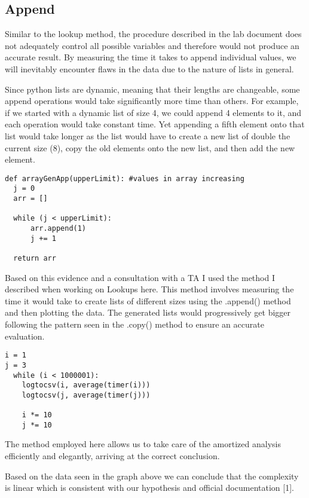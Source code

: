 \documentclass[12pt]{article}
\begin{document}
\subsection{Append}

Similar to the lookup method, the procedure described in the lab document does not adequately control all possible variables and therefore would not produce an accurate result. By measuring the time it takes to append individual values, we will inevitably encounter flaws in the data due to the nature of lists in general. 

Since python lists are dynamic, meaning that their lengths are changeable, some append operations would take significantly more time than others. For example, if we started with a dynamic list of size 4, we could append 4 elements to it, and each operation would take constant time. Yet appending a fifth element onto that list would take longer as the list would have to create a new list of double the current size (8), copy the old elements onto the new list, and then add the new element. 

\footnotesize
\begin{verbatim}
def arrayGenApp(upperLimit): #values in array increasing
  j = 0
  arr = []
  
  while (j < upperLimit):
      arr.append(1)
      j += 1

  return arr
\end{verbatim}
\normalsize

Based on this evidence and a consultation with a TA I used the method I described when working on Lookups here. This method involves measuring the time it would take to create lists of different sizes using the .append() method and then plotting the data. The generated lists would progressively get bigger following the pattern seen in the .copy() method to ensure an accurate evaluation.

\footnotesize
\begin{verbatim}
i = 1
j = 3
  while (i < 1000001):
    logtocsv(i, average(timer(i)))
    logtocsv(j, average(timer(j)))
    
    i *= 10
    j *= 10
\end{verbatim}
\normalsize

The method employed here allows us to take care of the amortized analysis efficiently and elegantly, arriving at the correct conclusion. 


Based on the data seen in the graph above we can conclude that the complexity is linear which is consistent with our hypothesis and official documentation [1].
\end{document}

